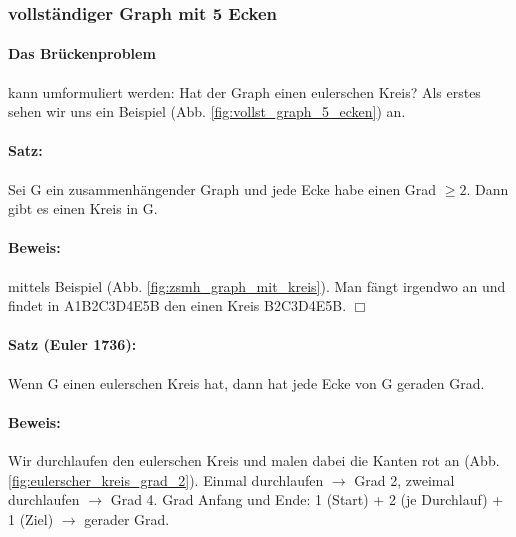 \renewcommand{\ldate}{2015-06-08}	%

\subsubsection{vollständiger Graph mit 5 Ecken}
\paragraph{Das Brückenproblem} kann umformuliert werden: Hat der Graph einen eulerschen Kreis? Als erstes sehen wir uns ein Beispiel (Abb. \ref{fig:vollst_graph_5_ecken}) an.




\paragraph{Satz:} Sei G ein zusammenhängender Graph und jede Ecke habe einen Grad $\geq 2$. Dann gibt es einen Kreis in G.

\paragraph{Beweis:} mittels Beispiel (Abb. \ref{fig:zsmh_graph_mit_kreis}). Man fängt irgendwo an und findet in A1B2C3D4E5B den einen Kreis B2C3D4E5B. $\Box$




\paragraph{Satz (Euler 1736):}Wenn G einen eulerschen Kreis hat, dann hat jede Ecke von G geraden Grad. 

\paragraph{Beweis:} Wir durchlaufen den eulerschen Kreis und malen dabei die Kanten rot an (Abb. \ref{fig:eulerscher_kreis_grad_2}). Einmal durchlaufen $\rightarrow$ Grad 2, zweimal durchlaufen $\rightarrow$ Grad 4. Grad Anfang und Ende: 1 (Start) + 2 (je Durchlauf) + 1 (Ziel) $\rightarrow$ gerader Grad. 




